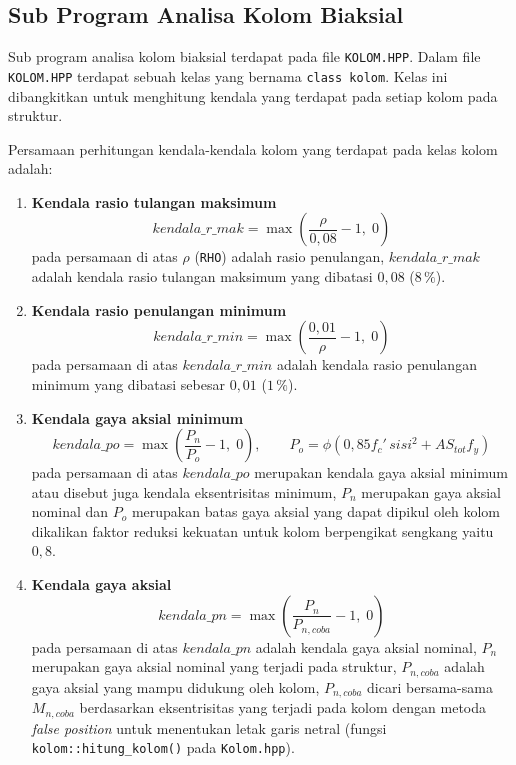 \subsection{Sub Program Analisa Kolom Biaksial}

Sub program analisa kolom biaksial terdapat pada file \texttt{KOLOM.HPP}.
Dalam file \texttt{KOLOM.HPP} terdapat sebuah kelas yang bernama
\texttt{class kolom}. Kelas ini dibangkitkan untuk menghitung kendala
yang terdapat pada setiap kolom pada struktur.

Persamaan perhitungan kendala-kendala kolom yang terdapat pada kelas
kolom adalah:

\begin{enumerate}[label=\arabic*.]
\item \textbf{Kendala rasio tulangan maksimum}
\begin{equation}
\mathit{kendala\_r\_mak} = \max\!\left(\frac{\rho}{0{,}08} - 1,\; 0\right)
\label{eq:3-6}
\end{equation}
pada persamaan di atas $\rho$ (\texttt{RHO}) adalah rasio penulangan,
$\mathit{kendala\_r\_mak}$ adalah kendala rasio tulangan maksimum yang
dibatasi $0{,}08$ ($8\,\%$).

\item \textbf{Kendala rasio penulangan minimum}
\begin{equation}
\mathit{kendala\_r\_min} = \max\!\left(\frac{0{,}01}{\rho} - 1,\; 0\right)
\label{eq:3-7}
\end{equation}
pada persamaan di atas $\mathit{kendala\_r\_min}$ adalah kendala rasio
penulangan minimum yang dibatasi sebesar $0{,}01$ ($1\,\%$).

\item \textbf{Kendala gaya aksial minimum}
\begin{equation}
\mathit{kendala\_po} = \max\!\left(\frac{P_n}{P_o} - 1,\; 0\right),
\qquad P_o = \phi\left(0{,}85 f_c' \,\mathit{sisi}^2 + AS_{tot} f_y\right)
\label{eq:3-8}
\end{equation}
pada persamaan di atas $\mathit{kendala\_po}$ merupakan kendala gaya
aksial minimum atau disebut juga kendala eksentrisitas minimum, $P_n$
merupakan gaya aksial nominal dan $P_o$ merupakan batas gaya aksial yang
dapat dipikul oleh kolom dikalikan faktor reduksi kekuatan untuk kolom
berpengikat sengkang yaitu $0{,}8$.

\item \textbf{Kendala gaya aksial}
\begin{equation}
\mathit{kendala\_pn} = \max\!\left(\frac{P_n}{P_{n,coba}} - 1,\; 0\right)
\label{eq:3-9}
\end{equation}
pada persamaan di atas $\mathit{kendala\_pn}$ adalah kendala gaya aksial
nominal, $P_n$ merupakan gaya aksial nominal yang terjadi pada struktur,
$P_{n,coba}$ adalah gaya aksial yang mampu didukung oleh kolom,
$P_{n,coba}$ dicari bersama-sama $M_{n,coba}$ berdasarkan eksentrisitas
yang terjadi pada kolom dengan metoda \textit{false position} untuk
menentukan letak garis netral (fungsi \texttt{kolom::hitung\_kolom()} pada
\texttt{Kolom.hpp}).


\end{enumerate}
